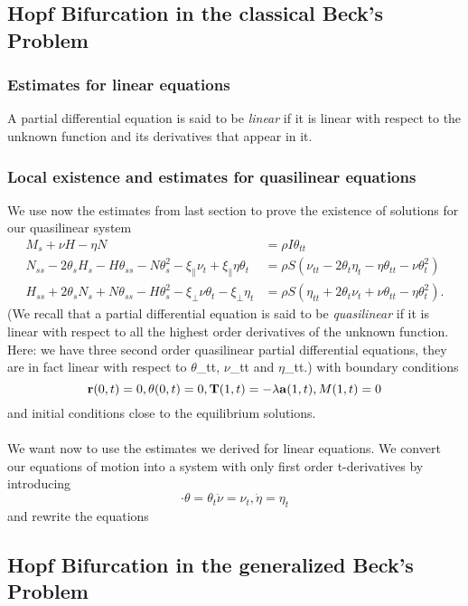 
\subsection{Hopf Bifurcation in the classical Beck's Problem}
\subsubsection{Estimates for linear equations}
A partial differential equation is said to be \emph{linear} if it is linear with respect to the unknown function and its derivatives that appear in it.
\subsubsection{Local existence and estimates for quasilinear equations}
We use now the estimates from last section to prove the existence of solutions for our quasilinear system
\[
\begin{align}
M_s + \nu H -\eta N 
&= \rho I \theta_{tt}\\
N_{ss} - 2\theta_sH_s - H\theta_{ss}- N\theta_s^2 
- \xi_{\parallel}\nu_t + \xi_{\parallel}\eta\theta_t
&= \rho S (\nu_{tt} - 2 \theta_t\eta_t - \eta\theta_{tt} - \nu\theta_t^2)\\
H_{ss} + 2\theta_sN_s + N\theta_{ss} - H\theta_s^2 
- \xi_{\perp}\nu\theta_t - \xi_{\perp}\eta_t
&= \rho S (\eta_{tt} + 2\theta_t\nu_t + \nu\theta_{tt} - \eta\theta_t^2).
\end{align}
\]
(We recall that a partial differential equation is said to be \emph{quasilinear} if it is linear with respect to all the highest order derivatives of the unknown function. Here: we have three second order quasilinear partial differential equations, they are in fact linear with respect to $\theta$_{tt}, $\nu$_{tt} and $\eta$_{tt}.)
with boundary conditions
\[
\mathbf{r}(0,t)= 0,\\
\theta(0,t) = 0,\\
\mathbf{T}(1,t) = -\lambda \mathbf{a}(1,t),\\
M(1,t) = 0\\
\]
and initial conditions close to the equilibrium solutions.
\\\\
We want now to use the estimates we derived for linear equations. We convert our equations of motion into a system with only first order t-derivatives by introducing
\[
\cdot\theta = \theta_t\dot\nu = \nu_t, \dot\eta = \eta_t
\]
and rewrite the equations 
\[
\]




\subsection{Hopf Bifurcation in the generalized Beck's Problem}
